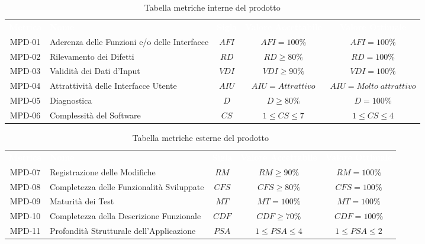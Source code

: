     \renewcommand{\arraystretch}{1.5}
    \begin{longtable}{ c C{4cm} c c c}
    \caption{Tabella metriche interne del prodotto}\\
    \textcolor{white}{\textbf{Metrica}} & \textcolor{white}{\textbf{Nome}} & \textcolor{white}{\textbf{Sigla}} & \textcolor{white}{\textbf{Valore Accettabile}} & \textcolor{white}{\textbf{Valore Ottimale}}\\
    MPD-01 & Aderenza delle Funzioni e/o delle Interfacce & $AFI$ & $AFI = 100\%$ & $AFI = 100\%$ \\
    MPD-02 & Rilevamento dei Difetti & $RD$ & $ RD \geq 80\% $ & $RD = 100\%$ \\
    MPD-03 & Validità dei Dati d'Input & $VDI$ &  $VDI \geq 90\%$ &  $VDI = 100\%$ \\
    MPD-04 & Attrattività delle Interfacce Utente & $AIU$ & $AIU = Attrattivo$ &  $AIU = Molto \; attrattivo$ \\
    MPD-05 & Diagnostica & $D$ & $D \geq 80\% $ & $D = 100\% $ \\
    MPD-06 & Complessità del Software & $CS $ & $1 \leq CS \leq 7 $ & $1 \leq CS \leq 4$ \\
    \end{longtable} 

\newpage %

    \renewcommand{\arraystretch}{1.5}
    \begin{longtable}{ c C{4cm} c c c}
    \caption{Tabella metriche esterne del prodotto}\\
    \textcolor{white}{\textbf{Metrica}} & \textcolor{white}{\textbf{Nome}} & \textcolor{white}{\textbf{Sigla}} & \textcolor{white}{\textbf{Valore Accettabile}} & \textcolor{white}{\textbf{Valore Ottimale}}\\
    MPD-07 & Registrazione delle Modifiche & $RM$ & $RM \geq 90\%$ & $RM = 100\%$ \\
    MPD-08 & Completezza delle Funzionalità Sviluppate & $CFS$ & $CFS \geq 80\%$ & $CFS = 100\%$  \\
    MPD-09 & Maturità dei Test & $MT$ & $MT=100\% $ & $MT=100\%$  \\	
    MPD-10 & Completezza della Descrizione Funzionale & $CDF $ & $CDF \geq 70\%$ & $CDF = 100\%$  \\
    MPD-11 &  Profondità Strutturale dell'Applicazione & $PSA$ & $1 \leq PSA \leq 4$ &$1 \leq PSA \leq 2$  \\
    \end{longtable}

